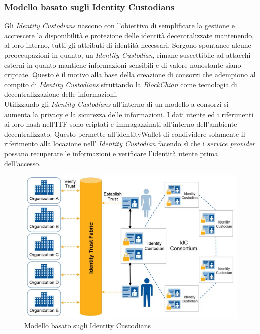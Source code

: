 \subsubsection{Modello basato sugli Identity Custodians}
Gli \textit{Identity Custodians} nascono con l'obiettivo di semplificare la gestione e accrescere la disponibilità e protezione delle identità decentralizzate mantenendo, al loro interno, tutti gli attributi di identità necessari.
Sorgono spontanee alcune preoccupazioni in quanto, un \textit{Identity Custodian}, rimane suscettibile ad attacchi esterni in quanto mantiene informazioni sensibili e di valore nonostante siano criptate. Questo è il motivo alla base della creazione di consorzi che adempiono al compito di \textit{Identity Custodians} sfruttando la \textit{BlockChian} come tecnologia di decentralizzazione delle informazioni.\\
Utilizzando gli \textit{Identity Custodians} all'interno di un modello a consorzi si aumenta la privacy e la sicurezza delle informazioni. I dati utente ed i riferimenti ai loro hash nell'\gls{ITF} sono criptati e immagazzinati all'interno dell'ambiente decentralizzato. Questo permette all'\gls{identityWallet} di condividere solamente il riferimento alla locazione nell' \textit{Identity Custodian} facendo sì che i \textit{service provider} possano recuperare le informazioni e verificare l'identità utente prima dell'accesso\cite{ITF_gartner}.
\begin{figure}[h]
	\centering
	\includegraphics[scale=0.50]{immagini/ITF_IdentityCustodians}
	\caption{Modello basato sugli Identity Custodians}
\end{figure}

